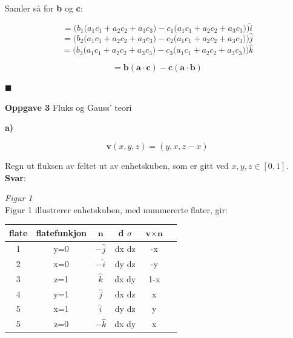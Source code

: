 \documentclass[a4paper,norsk,12pt]{article}
\begin{document}
Samler så for \textbf{b} og \textbf{c}:

$$
= \Big( b_1 \Big(a_1 c_1 + a_2 c_2 + a_3 c_3 \Big) - c_1 \Big(a_1 c_1 + a_2 c_2 + a_3 c_3 \Big) \Big) \hat i
$$
$$
= \Big( b_2 \Big(a_1 c_1 + a_2 c_2 + a_3 c_3 \Big) - c_2 \Big(a_1 c_1 + a_2 c_2 + a_3 c_3 \Big) \Big) \hat j
$$
$$
= \Big( b_3 \Big(a_1 c_1 + a_2 c_2 + a_3 c_3 \Big) - c_3 \Big(a_1 c_1 + a_2 c_2 + a_3 c_3 \Big) \Big) \hat k
$$


$$
= \textbf{b} (\textbf{a} \cdot \textbf{c}) - \textbf{c} (\textbf{a} \cdot \textbf{b})
$$

\hspace{110mm}$\blacksquare$



\textbf{Oppgave 3} \hspace{3mm} Fluks og Gauss' teori

\textbf{a)} 

$$ \textbf{v}(x,y,z) = (y, x, z-x) $$

Regn ut fluksen av feltet ut av enhetskuben, som er gitt ved $ x,y,z \in [0,1].$\\

\textbf{Svar}: 


\hspace{25mm}

\hspace{40mm}\textit{Figur 1}\\

Figur 1 illustrerer enhetskuben, med nummererte flater, gir:

\begin{table}[h!]
  \centering

  \label{tab:table1}
  \begin{tabular}{c|c|c|c|c|c}
    flate & flatefunkjon & $ \textbf{n} $ & d $\sigma$ & $\textbf{v} \times \textbf{n}$\\
    \hline
    1 & y=0 & $ -\hat j $ & dx dz & -x \\
    \hline
    2 & x=0 & $ -\hat i $ & dy dz & -y \\
    \hline
    3 & z=1 & $ \hat k $ & dx dy & 1-x \\
    \hline
    4 & y=1 & $ \hat j $ & dx dz & x \\
    \hline
    5 & x=1 & $ \hat i $ & dy dz & y \\
    \hline
    5 & z=0 & $ -\hat k $ & dx dy & x 
  \end{tabular}
\end{table}
\end{document}
